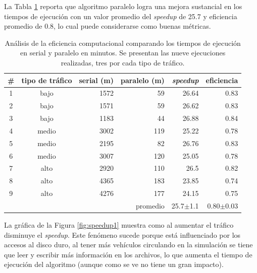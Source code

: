  La Tabla \ref{table:analisis_speedup} reporta que algoritmo paralelo logra una mejora sustancial en los tiempos de ejecución con un valor promedio del \emph{speedup} de 25.7  y  eficiencia promedio de 0.8, lo cual puede considerarse como buenas métricas.

\begin{table}[H]
	\renewcommand{\arraystretch}{1.2}
	\caption[Análisis de la eficiencia computacional.]{Análisis de la eficiencia computacional comparando los tiempos de ejecución en serial y paralelo en minutos. Se presentan las nueve ejecuciones realizadas, tres por cada tipo de tráfico. }
	\label{table:analisis_speedup}
	\centering
	\begin{tabular}{ccrrrr}
		\hline
		
		\#&
		tipo de \newline tráfico& 		 
		serial (m) & 
		paralelo (m) &
		\emph{speedup} &
		eficiencia
		\\ 
		\hline
		1& bajo  & 1572 & 59 & 26.64 & 0.83\\
		2& bajo  & 1571 & 59 & 26.62 & 0.83\\
		3& bajo  & 1183 & 44 & 26.88 & 0.84\\
		
		4& medio  & 3002 & 119 & 25.22 & 0.78\\
		5& medio  & 2195 & 82 & 26.76 & 0.83\\
		6& medio  & 3007 & 120 & 25.05 & 0.78\\
		
		7& alto  & 2920 & 110 & 26.5 & 0.82\\
		8& alto  & 4365 & 183 & 23.85 & 0.74\\
		9& alto  & 4276 & 177 & 24.15 & 0.75\\
		\hline
		 &  &  & promedio & 25.7$\pm$1.1 & 0.80$\pm$0.03\\
		
		\hline
	\end{tabular}
\end{table}



La gráfica de la Figura \ref{fig:speedup1} muestra como al aumentar el tráfico disminuye el \emph{speedup}. Este fenómeno sucede porque está influenciado por los accesos al disco duro, al tener más vehículos circulando en la simulación se tiene que leer y escribir más información en los archivos, lo que aumenta el tiempo de ejecución del algoritmo (aunque como se ve no tiene un gran impacto).

